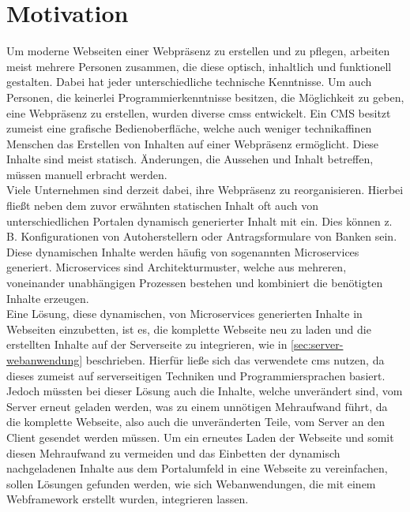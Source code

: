 \section{Motivation}

Um moderne Webseiten einer Webpräsenz zu erstellen und zu pflegen, arbeiten meist mehrere Personen zusammen, die diese optisch, inhaltlich und funktionell gestalten. Dabei hat jeder unterschiedliche technische Kenntnisse. Um auch Personen, die keinerlei Programmierkenntnisse besitzen, die Möglichkeit zu geben, eine Webpräsenz zu erstellen, wurden diverse \acfp{cms} entwickelt. Ein CMS besitzt zumeist eine grafische Bedienoberfläche, welche auch weniger technikaffinen Menschen das Erstellen von Inhalten auf einer Webpräsenz ermöglicht. Diese Inhalte sind meist statisch. Änderungen, die Aussehen und Inhalt betreffen, müssen manuell erbracht werden. \\
Viele Unternehmen sind derzeit dabei, ihre Webpräsenz zu reorganisieren. Hierbei fließt neben dem zuvor erwähnten statischen Inhalt oft auch von unterschiedlichen Portalen dynamisch generierter Inhalt mit ein. Dies können z. B. Konfigurationen von Autoherstellern oder Antragsformulare von Banken sein. Diese dynamischen Inhalte werden häufig von sogenannten Microservices generiert. Microservices sind Architekturmuster, welche aus mehreren, voneinander unabhängigen Prozessen bestehen und kombiniert die benötigten Inhalte erzeugen. \\
Eine Lösung, diese dynamischen, von Microservices generierten Inhalte in Webseiten einzubetten, ist es, die komplette Webseite neu zu laden und die erstellten Inhalte auf der Serverseite zu integrieren, wie in \autoref{sec:server-webanwendung} beschrieben. Hierfür ließe sich das verwendete \ac{cms} nutzen, da dieses zumeist auf serverseitigen Techniken und Programmiersprachen basiert. Jedoch müssten bei dieser Lösung auch die Inhalte, welche unverändert sind, vom Server erneut geladen werden, was zu einem unnötigen Mehraufwand führt, da die komplette Webseite, also auch die unveränderten Teile, vom Server an den Client gesendet werden müssen. Um ein erneutes Laden der Webseite und somit diesen Mehraufwand zu vermeiden und das Einbetten der dynamisch nachgeladenen Inhalte aus dem Portalumfeld in eine Webseite zu vereinfachen, sollen Lösungen gefunden werden, wie sich Webanwendungen, die mit einem Webframework erstellt wurden, integrieren lassen.